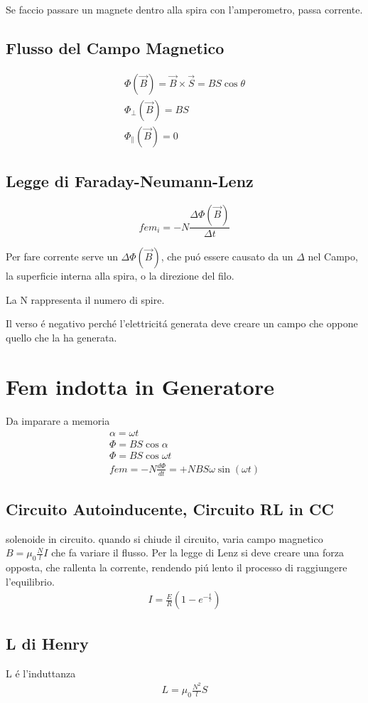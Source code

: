 \documentclass{article}
\begin{document}
Se faccio passare un magnete dentro alla spira con l'amperometro, passa corrente.
\subsection{Flusso del Campo Magnetico}
\begin{gather*}
\Phi(\vec{B})=\vec{B}\times\vec{S}=BS\cos \theta\\
\Phi_{\perp}(\vec{B})=BS\\
\Phi_{\parallel}(\vec{B})=0
\end{gather*}
\subsection{Legge di Faraday-Neumann-Lenz}
\[fem_i=-N\frac{\Delta\Phi(\vec{B})}{\Delta t}\]

Per fare corrente serve un $\Delta\Phi(\vec{B})$, che puó essere causato da un $\Delta$ nel Campo, la superficie interna alla spira, o la direzione del filo.

La N rappresenta il numero di spire.

Il verso é negativo perché l'elettricitá generata deve creare un campo che oppone quello che la ha generata.
\section{Fem indotta in Generatore}
Da imparare a memoria
\begin{gather*}
    \alpha = \omega t\\
    \Phi = BS\cos \alpha\\
    \Phi = BS\cos \omega t\\
fem = -N\frac{d\Phi}{dt} = +NBS\omega\sin(\omega t)
\end{gather*}
\subsection{Circuito Autoinducente, Circuito RL in CC}
solenoide in circuito. quando si chiude il circuito, varia campo magnetico $B= \mu_0 \frac{N}{l}I$ che fa variare il flusso. Per la legge di Lenz si deve creare una forza opposta, che rallenta la corrente, rendendo piú lento il processo di raggiungere l'equilibrio.
\begin{gather*}
I = \frac{E}{R}(1 - e^{-\frac{t}{\tau}})
\end{gather*}
\subsection{L di Henry}
L é l'induttanza
\begin{gather*}
    L= \mu_0\frac{N^2}{l}S
\end{gather*}
\end{document}
